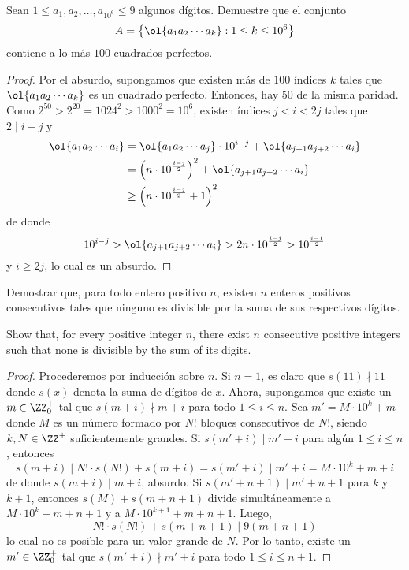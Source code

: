 
\begin{probEG}
	Sean $1\le a_1,a_2,\dots,a_{10^6}\le 9$ algunos dígitos. Demuestre que el conjunto
	\[A=\left\{\ol{a_1a_2\cdots a_k}:1\le k\le 10^6\right\}\]
	contiene a lo más $100$ cuadrados perfectos.
\end{probEG}

\begin{proof}
	Por el absurdo, supongamos que existen más de $100$ índices $k$ tales que $\ol{a_1a_2\cdots a_k}$ es un cuadrado perfecto. Entonces, hay $50$ de la misma paridad. Como $2^{50}>2^{20}=1024^2>1000^2=10^6$, existen índices $j<i<2j$ tales que $2\mid i-j$ y
	\begin{align*}
		\ol{a_1a_2\cdots a_i}
		&=\ol{a_1a_2\cdots a_j}\cdot 10^{i-j}+\ol{a_{j+1}a_{j+2}\cdots a_i}\\
		&=\left(n\cdot 10^\frac{i-j}{2}\right)^2+\ol{a_{j+1}a_{j+2}\cdots a_i}\\
		&\ge\left(n\cdot 10^\frac{i-j}{2}+1\right)^2
	\end{align*}
	de donde
	\[10^{i-j}>\ol{a_{j+1}a_{j+2}\cdots a_i}>2n\cdot 10^\frac{i-j}{2}>10^\frac{i-1}{2}\]
	y $i\ge 2j$, lo cual es un absurdo.
\end{proof}


\begin{probMG}[IberoAmerican 2012/6]
	Demostrar que, para todo entero positivo $n$, existen $n$ enteros positivos consecutivos tales que ninguno es divisible por la suma de sus respectivos dígitos.
	\begin{hint}
		Show that, for every positive integer $n$, there exist $n$ consecutive positive integers such that none is divisible by the sum of its digits.
	\end{hint}
\end{probMG}

\begin{proof}
	Procederemos por inducción sobre $n$. Si $n=1$, es claro que $s(11)\nmid 11$ donde $s(x)$ denota la suma de dígitos de $x$. Ahora, supongamos que existe un $m\in\ZZ^+_0$ tal que $s(m+i)\nmid m+i$ para todo $1\le i\le n$. Sea $m'=M\cdot 10^k+m$ donde $M$ es un número formado por $N!$ bloques consecutivos de $N!$, siendo $k,N\in\ZZ^+$ suficientemente grandes. Si $s(m'+i)\mid m'+i$ para algún $1\le i\le n$, entonces
	\[s(m+i)\mid N!\cdot s(N!)+s(m+i)=s(m'+i)\mid m'+i=M\cdot 10^k+m+i\]
	de donde $s(m+i)\mid m+i$, absurdo. Si $s(m'+n+1)\mid m'+n+1$ para $k$ y $k+1$, entonces $s(M)+s(m+n+1)$ divide simultáneamente a $M\cdot 10^k+m+n+1$ y a $M\cdot 10^{k+1}+m+n+1$. Luego,
	\[N!\cdot s(N!)+s(m+n+1)\mid 9(m+n+1)\]
	lo cual no es posible para un valor grande de $N$. Por lo tanto, existe un $m'\in\ZZ^+_0$ tal que $s(m'+i)\nmid m'+i$ para todo $1\le i\le n+1$.
\end{proof}

